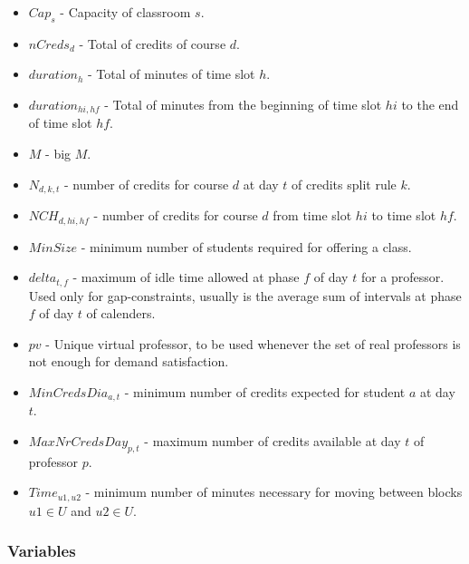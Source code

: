 \begin{itemize}
\item $Cap_{s}$ - Capacity of classroom $s$.
\item $nCreds_{d}$ - Total of credits of course $d$.
\item $duration_{h}$ - Total of minutes of time slot $h$.
\item $duration_{hi,hf}$ - Total of minutes from the beginning of time slot $hi$ to the end of time slot $hf$.
\item $M$ - big $M$.
\item $N_{d,k,t}$ - number of credits for course $d$ at day $t$ of credits split rule $k$.
\item $NCH_{d,hi,hf}$ - number of credits for course $d$ from time slot $hi$ to time slot $hf$.
\item $MinSize$ - minimum number of students required for offering a class.
\item $delta_{t,f}$ - maximum of idle time allowed at phase $f$ of day $t$ for a professor. Used only for gap-constraints, usually is the average sum of intervals at phase $f$ of day $t$ of calenders.
\item $pv$ - Unique virtual professor, to be used whenever the set of real professors is not enough for demand satisfaction.
\item $MinCredsDia_{a,t}$ - minimum number of credits expected for student $a$ at day $t$.
\item $MaxNrCredsDay_{p,t}$ - maximum number of credits available at day $t$ of professor $p$.
\item $Time_{u1,u2}$ - minimum number of minutes necessary for moving between blocks $u1 \in U$ and $u2 \in U$.
\end{itemize}

\subsubsection{Variables}

